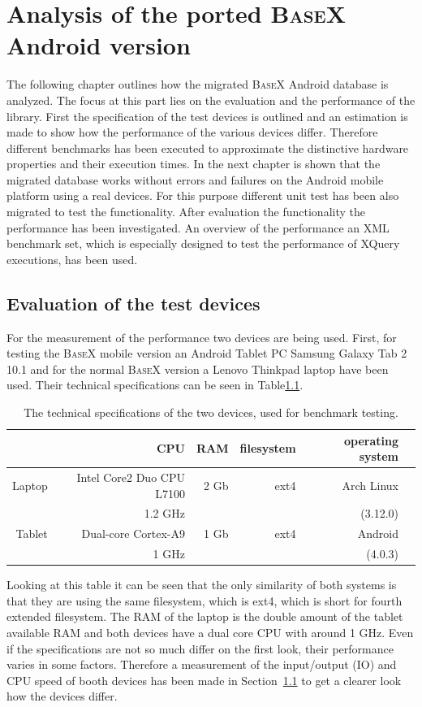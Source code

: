 \chapter{Analysis of the ported \textsc{BaseX} Android version}
\label{cha:analysis}
The following chapter outlines how the migrated \textsc{BaseX} Android database is analyzed.
The focus at this part lies on the evaluation and the performance of the library.
First the specification of the test devices is outlined and an estimation is made to show how the performance of the various devices differ.
Therefore different benchmarks has been executed to approximate the distinctive hardware properties and their execution times.
In the next chapter is shown that the migrated database works without errors and failures on the Android mobile platform using a real devices.
For this purpose different unit test has been also migrated to test the functionality.
After evaluation the functionality the performance has been investigated.
An overview of the performance an XML benchmark set, which is especially designed to test the performance of XQuery executions, has been used.
\section{Evaluation of the test devices}
\label{sec:evaluation-of-the-test-devices}
For the measurement of the performance two devices are being used.
First, for testing the \textsc{BaseX} mobile version an Android Tablet PC Samsung Galaxy Tab 2 10.1 and for the normal \textsc{BaseX} version a Lenovo Thinkpad laptop have been used.
Their technical specifications can be seen in Table\ref{tab:test-dev-specs}.
\begin {table}[htpb] 
  \centering
\begin {tabular} {|r|r|r|r|r|r|}
  	\hline
	&CPU&RAM&filesystem&operating system\\
	\hline
	Laptop&Intel Core2 Duo CPU L7100&2 Gb&ext4&Arch Linux\\
	&1.2 GHz&&&(3.12.0)\\
	\hline
	Tablet&Dual-core Cortex-A9&1 Gb&ext4&Android\\
	&1 GHz&&&(4.0.3)\\
	\hline
\end {tabular}
\caption {The technical specifications of the two devices, used for benchmark testing.}
\label {tab:test-dev-specs}
\end {table}

Looking at this table it can be seen that the only similarity of both systems is that they are using the same filesystem, which is ext4, which is short for fourth extended filesystem.
The RAM of the laptop is the double amount of the tablet available RAM and both devices have a dual core CPU with around 1 GHz.
Even if the specifications are not so much differ on the first look, their performance varies in some factors.
Therefore a measurement of the input/output (IO) and CPU speed of booth devices has been made in Section~\ref{sec:evaluation-of-the-test-devices} to get a clearer look how the devices differ.


